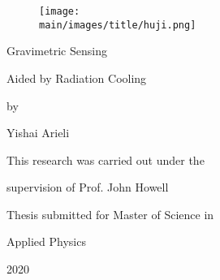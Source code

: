 \documentclass[\main/master.tex]{subfiles}
\begin{document}
\pagestyle{empty}
\begin{titlepage}
\begin{figure}[htbp]
	\centering
	\texttt{[image: \\main/images/title/huji.png]}
\end{figure}
\doublespacing
\begin{center}
  {\titlefont Gravimetric Sensing \par \vspace{10 mm}
   Aided by Radiation Cooling
   }
   \vspace{1in}
   
   by\par
   
   Yishai Arieli\par
   This research was carried out under the\par
   supervision of Prof. John Howell\par
   \vspace{1.5in}
   
   Thesis submitted for Master of Science in\par
   Applied Physics\par
   2020
   \end{center}
  \end{titlepage}
\end{document}
